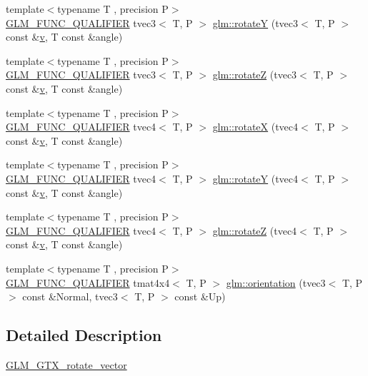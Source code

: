 \begin{DoxyCompactItemize}
\item 
{\footnotesize template$<$typename T , precision P$>$ }\\\mbox{\hyperlink{setup_8hpp_a33fdea6f91c5f834105f7415e2a64407}{G\+L\+M\+\_\+\+F\+U\+N\+C\+\_\+\+Q\+U\+A\+L\+I\+F\+I\+ER}} tvec3$<$ T, P $>$ \mbox{\hyperlink{group__gtx__rotate__vector_gabb5d19eba5befeebcb35a0aad4a114e3}{glm\+::rotateY}} (tvec3$<$ T, P $>$ const \&\mbox{\hyperlink{glad_8h_a14cfbe2fc2234f5504618905b69d1e06}{v}}, T const \&angle)
\item 
{\footnotesize template$<$typename T , precision P$>$ }\\\mbox{\hyperlink{setup_8hpp_a33fdea6f91c5f834105f7415e2a64407}{G\+L\+M\+\_\+\+F\+U\+N\+C\+\_\+\+Q\+U\+A\+L\+I\+F\+I\+ER}} tvec3$<$ T, P $>$ \mbox{\hyperlink{group__gtx__rotate__vector_gae30ac01b89d4f16a972fee696c964908}{glm\+::rotateZ}} (tvec3$<$ T, P $>$ const \&\mbox{\hyperlink{glad_8h_a14cfbe2fc2234f5504618905b69d1e06}{v}}, T const \&angle)
\item 
{\footnotesize template$<$typename T , precision P$>$ }\\\mbox{\hyperlink{setup_8hpp_a33fdea6f91c5f834105f7415e2a64407}{G\+L\+M\+\_\+\+F\+U\+N\+C\+\_\+\+Q\+U\+A\+L\+I\+F\+I\+ER}} tvec4$<$ T, P $>$ \mbox{\hyperlink{group__gtx__rotate__vector_gadab312d430a564741ae02215255027a0}{glm\+::rotateX}} (tvec4$<$ T, P $>$ const \&\mbox{\hyperlink{glad_8h_a14cfbe2fc2234f5504618905b69d1e06}{v}}, T const \&angle)
\item 
{\footnotesize template$<$typename T , precision P$>$ }\\\mbox{\hyperlink{setup_8hpp_a33fdea6f91c5f834105f7415e2a64407}{G\+L\+M\+\_\+\+F\+U\+N\+C\+\_\+\+Q\+U\+A\+L\+I\+F\+I\+ER}} tvec4$<$ T, P $>$ \mbox{\hyperlink{group__gtx__rotate__vector_gae2507577c4bffa3548b32852791dd90c}{glm\+::rotateY}} (tvec4$<$ T, P $>$ const \&\mbox{\hyperlink{glad_8h_a14cfbe2fc2234f5504618905b69d1e06}{v}}, T const \&angle)
\item 
{\footnotesize template$<$typename T , precision P$>$ }\\\mbox{\hyperlink{setup_8hpp_a33fdea6f91c5f834105f7415e2a64407}{G\+L\+M\+\_\+\+F\+U\+N\+C\+\_\+\+Q\+U\+A\+L\+I\+F\+I\+ER}} tvec4$<$ T, P $>$ \mbox{\hyperlink{group__gtx__rotate__vector_ga034e5d197ab4bd8685624bc2cf16e586}{glm\+::rotateZ}} (tvec4$<$ T, P $>$ const \&\mbox{\hyperlink{glad_8h_a14cfbe2fc2234f5504618905b69d1e06}{v}}, T const \&angle)
\item 
{\footnotesize template$<$typename T , precision P$>$ }\\\mbox{\hyperlink{setup_8hpp_a33fdea6f91c5f834105f7415e2a64407}{G\+L\+M\+\_\+\+F\+U\+N\+C\+\_\+\+Q\+U\+A\+L\+I\+F\+I\+ER}} tmat4x4$<$ T, P $>$ \mbox{\hyperlink{group__gtx__rotate__vector_ga49b4d082305cdfcfe0a5c184f684a902}{glm\+::orientation}} (tvec3$<$ T, P $>$ const \&Normal, tvec3$<$ T, P $>$ const \&Up)
\end{DoxyCompactItemize}


\subsection{Detailed Description}
\mbox{\hyperlink{group__gtx__rotate__vector}{G\+L\+M\+\_\+\+G\+T\+X\+\_\+rotate\+\_\+vector}} 